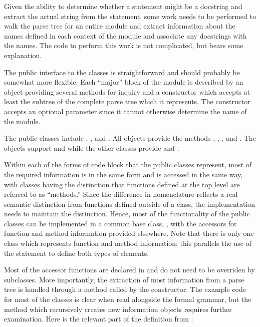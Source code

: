 Given the ability to determine whether a statement might be a
docstring and extract the actual string from the statement, some work
needs to be performed to walk the parse tree for an entire module and
extract information about the names defined in each context of the
module and associate any docstrings with the names.  The code to
perform this work is not complicated, but bears some explanation.

The public interface to the classes is straightforward and should
probably be somewhat more flexible.  Each ``major'' block of the
module is described by an object providing several methods for inquiry
and a constructor which accepts at least the subtree of the complete
parse tree which it represents.  The  constructor
accepts an optional  parameter since it cannot
otherwise determine the name of the module.

The public classes include , ,
and .  All objects provide the
methods , ,
, and .  The
 objects support  and
 while the other classes provide
 and .

Within each of the forms of code block that the public classes
represent, most of the required information is in the same form and is
accessed in the same way, with classes having the distinction that
functions defined at the top level are referred to as ``methods.''
Since the difference in nomenclature reflects a real semantic
distinction from functions defined outside of a class, the
implementation needs to maintain the distinction.
Hence, most of the functionality of the public classes can be
implemented in a common base class, , with the
accessors for function and method information provided elsewhere.
Note that there is only one class which represents function and method
information; this parallels the use of the  statement to
define both types of elements.

Most of the accessor functions are declared in 
and do not need to be overriden by subclasses.  More importantly, the
extraction of most information from a parse tree is handled through a
method called by the  constructor.  The example
code for most of the classes is clear when read alongside the formal
grammar, but the method which recursively creates new information
objects requires further examination.  Here is the relevant part of
the  definition from :

